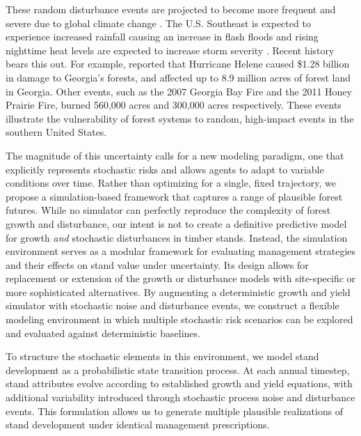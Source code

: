 \documentclass[12pt]{report}
\begin{document}
These random disturbance events are projected to become more frequent and severe due to global climate change \parencite{marvelChapter2Climate2023}. The U.S. Southeast is expected to experience increased rainfall causing an increase in flash floods and rising nighttime heat levels are expected to increase storm severity \parencite{marvelChapter2Climate2023}. Recent history bears this out. For example, \textcite{helene_damage_assessment} reported that Hurricane Helene caused \$1.28 billion in damage to Georgia's forests, and affected up to 8.9 million acres of forest land in Georgia. Other events, such as the 2007 Georgia Bay Fire and the 2011 Honey Prairie Fire, burned 560,000 acres and 300,000 acres respectively. These events illustrate the vulnerability of forest systems to random, high-impact events in the southern United States.

The magnitude of this uncertainty calls for a new modeling paradigm, one that explicitly represents stochastic risks and allows agents to adapt to variable conditions over time. Rather than optimizing for a single, fixed trajectory, we propose a simulation-based framework that captures a range of plausible forest futures. While no simulator can perfectly reproduce the complexity of forest growth and disturbance, our intent is not to create a definitive predictive model for growth \textit{and} stochastic disturbances in timber stands. Instead, the simulation environment serves as a modular framework for evaluating management strategies and their effects on stand value under uncertainty. Its design allows for replacement or extension of the growth or disturbance models with site-specific or more sophisticated alternatives. By augmenting a deterministic growth and yield simulator with stochastic noise and disturbance events, we construct a flexible modeling environment in which multiple stochastic risk scenarios can be explored and evaluated against deterministic baselines.

To structure the stochastic elements in this environment, we model stand development as a probabilistic state transition process. At each annual timestep, stand attributes evolve according to established growth and yield equations, with additional variability introduced through stochastic process noise and disturbance events. This formulation allows us to generate multiple plausible realizations of stand development under identical management prescriptions.
\end{document}
